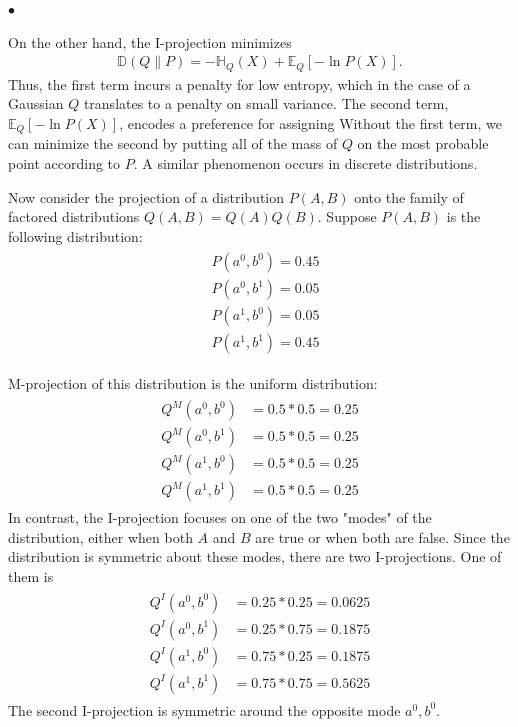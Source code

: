 \documentclass{article}
\begin{document}
$\bullet$ 

On the other hand, the I-projection minimizes
\begin{align*}
\mathbb{D}(Q \| P)=-\mathbb{H}_{Q}(X)+\mathbb{E}_{Q}[-\ln P(X)] .
\end{align*}
Thus, the first term incurs a penalty for low entropy, which in the case of a Gaussian $Q$ translates to a penalty on small variance. The second term, $\mathbb{E}_{Q}[-\ln P(X)]$, encodes a preference for assigning  Without the first term, we can minimize the second by putting all of the mass of $Q$ on the most probable point according to $P$. 
A similar phenomenon occurs in discrete distributions.
\begin{exma}
Now consider the projection of a distribution $P(A, B)$ onto the family of factored distributions $Q(A, B)=Q(A) Q(B)$. Suppose $P(A, B)$ is the following distribution:
\begin{align*}
\begin{aligned}
&P\left(a^{0}, b^{0}\right)=0.45 \\
&P\left(a^{0}, b^{1}\right)=0.05 \\
&P\left(a^{1}, b^{0}\right)=0.05 \\
&P\left(a^{1}, b^{1}\right)=0.45
\end{aligned}
\end{align*}

M-projection of this distribution is 
the uniform distribution:
\begin{align*}
\begin{aligned}
Q^{M}\left(a^{0}, b^{0}\right) &=0.5 * 0.5=0.25 \\
Q^{M}\left(a^{0}, b^{1}\right) &=0.5 * 0.5=0.25 \\
Q^{M}\left(a^{1}, b^{0}\right) &=0.5 * 0.5=0.25 \\
Q^{M}\left(a^{1}, b^{1}\right) &=0.5 * 0.5=0.25
\end{aligned}
\end{align*}
In contrast, the I-projection focuses on one of the two "modes" of the distribution, either when both $A$ and $B$ are true or when both are false. Since the distribution is symmetric about these modes, there are two I-projections. One of them is
\begin{align*}
\begin{aligned}
Q^{I}\left(a^{0}, b^{0}\right) &=0.25 * 0.25=0.0625 \\
Q^{I}\left(a^{0}, b^{1}\right) &=0.25 * 0.75=0.1875 \\
Q^{I}\left(a^{1}, b^{0}\right) &=0.75 * 0.25=0.1875 \\
Q^{I}\left(a^{1}, b^{1}\right) &=0.75 * 0.75=0.5625
\end{aligned}
\end{align*}
The second I-projection is symmetric around the opposite mode $a^{0}, b^{0}$.
\end{exma}
\end{document}
